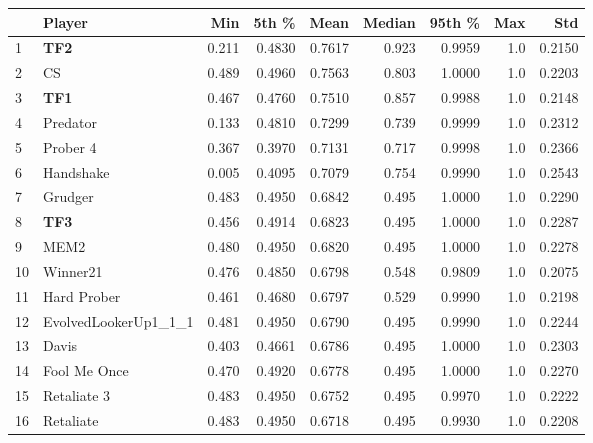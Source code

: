 \begin{tabular}{llrrrrrrr}
\toprule
{} &                Player &    Min &   5th \% &    Mean &  Median &  95th \% &  Max &     Std \\
\midrule
1  &                   \textbf{TF2} &  0.211 &  0.4830 &  0.7617 &   0.923 &  0.9959 &  1.0 &  0.2150 \\
2  &                    CS &  0.489 &  0.4960 &  0.7563 &   0.803 &  1.0000 &  1.0 &  0.2203 \\
3  &                   \textbf{TF1} &  0.467 &  0.4760 &  0.7510 &   0.857 &  0.9988 &  1.0 &  0.2148 \\
4  &              Predator &  0.133 &  0.4810 &  0.7299 &   0.739 &  0.9999 &  1.0 &  0.2312 \\
5  &              Prober 4 &  0.367 &  0.3970 &  0.7131 &   0.717 &  0.9998 &  1.0 &  0.2366 \\
6  &             Handshake &  0.005 &  0.4095 &  0.7079 &   0.754 &  0.9990 &  1.0 &  0.2543 \\
7  &               Grudger &  0.483 &  0.4950 &  0.6842 &   0.495 &  1.0000 &  1.0 &  0.2290 \\
8  &                   \textbf{TF3} &  0.456 &  0.4914 &  0.6823 &   0.495 &  1.0000 &  1.0 &  0.2287 \\
9  &                  MEM2 &  0.480 &  0.4950 &  0.6820 &   0.495 &  1.0000 &  1.0 &  0.2278 \\
10 &              Winner21 &  0.476 &  0.4850 &  0.6798 &   0.548 &  0.9809 &  1.0 &  0.2075 \\
11 &           Hard Prober &  0.461 &  0.4680 &  0.6797 &   0.529 &  0.9990 &  1.0 &  0.2198 \\
12 &  EvolvedLookerUp1\_1\_1 &  0.481 &  0.4950 &  0.6790 &   0.495 &  0.9990 &  1.0 &  0.2244 \\
13 &                 Davis &  0.403 &  0.4661 &  0.6786 &   0.495 &  1.0000 &  1.0 &  0.2303 \\
14 &          Fool Me Once &  0.470 &  0.4920 &  0.6778 &   0.495 &  1.0000 &  1.0 &  0.2270 \\
15 &           Retaliate 3 &  0.483 &  0.4950 &  0.6752 &   0.495 &  0.9970 &  1.0 &  0.2222 \\
16 &             Retaliate &  0.483 &  0.4950 &  0.6718 &   0.495 &  0.9930 &  1.0 &  0.2208 \\
\bottomrule
\end{tabular}
